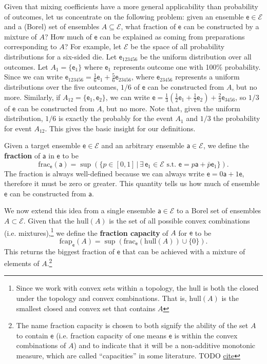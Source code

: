 \documentclass[10pt,twocolumn, nofootinbib]{revtex4-2}
\newcommand\hull{\mathrm{hull}}
\newcommand\fraction{\mathrm{frac}}
\newcommand\frcap{\mathrm{fcap}}
\newcommand{\ens}[1][e] {\mathsf{#1}} %
\newcommand{\Ens}[1][E] {\mathcal{#1}} %
\begin{document}
Given that mixing coefficients have a more general applicability than probability of outcomes, let us concentrate on the following problem: given an ensemble $\ens \in \Ens$ and a (Borel) set of ensembles $A \subseteq \Ens$, what fraction of $\ens$ can be constructed by a mixture of $A$? How much of $\ens$ can be explained as coming from preparations corresponding to $A$? For example, let $\Ens$ be the space of all probability distributions for a six-sided die. Let $\ens_{123456}$ be the uniform distribution over all outcomes. Let $A_1 = \{\ens_1\}$ where $\ens_1$ represents outcome one with 100\% probability. Since we can write $\ens_{123456} = \frac{1}{6} \ens_{1} + \frac{5}{6} \ens_{23456}$, where $\ens_{23456}$ represents a uniform distributions over the five outcomes, $1/6$ of $\ens$ can be constructed from $A$, but no more. Similarly, if $A_{12} = \{\ens_{1},\ens_{2}\}$, we can write $\ens = \frac{1}{3} \left(\frac{1}{2} \ens_1 + \frac{1}{2} \ens_2 \right)  + \frac{2}{3} \ens_{3456}$, so $1/3$ of $\ens$ can be constructed from $A$, but no more. Note that, given the uniform distribution, $1/6$ is exactly the probably for the event $A_1$ and $1/3$ the probability for event $A_{12}$. This gives the basic insight for our definitions.

Given a target ensemble $\ens \in \Ens$ and an arbitrary ensemble $\ens[a] \in \Ens$, we define the \textbf{fraction} of $\ens[a]$ in $\ens$ to be
\begin{equation}
	\fraction_{\ens}(\ens[a]) = \sup(\{ p \in [0,1] \, | \, \exists \, \ens_1 \in \Ens \text{ s.t. }  \ens = p \ens[a] + \bar{p} \ens_1 \}).
\end{equation}
The fraction is always well-defined because we can always write $\ens = 0 \ens[a] + 1 \ens$, therefore it must be zero or greater. This quantity tells us how much of ensemble $\ens$ can be constructed from $\ens[a]$. 

We now extend this idea from a single ensemble $\ens[a] \in \Ens$ to a Borel set of ensembles $A \subset \Ens$. Given that the $\hull(A)$ is the set of all possible convex combinations (i.e. mixtures),\footnote{Since we work with convex sets within a topology, the hull is both the closed under the topology and convex combinations. That is, $\hull(A)$ is the smallest closed and convex set that contains $A$} we define the \textbf{fraction capacity} of $A$ for $\ens$ to be
\begin{equation}
	\frcap_{\ens}(A) = \sup(\fraction_{\ens}(\hull(A))\cup\{0\}).
\end{equation}
This returns the biggest fraction of $\ens$ that can be achieved with a mixture of elements of $A$.\footnote{The name fraction capacity is chosen to both signify the ability of the set $A$ to contain $\ens$ (i.e. fraction capacity of one means $\ens$ is within the convex combinations of $A$) and to indicate that it will be a non-additive monotonic measure, which are called ``capacities'' in some literature. TODO \href{ https://link.springer.com/book/10.1007/978-3-319-03155-2}{cite} }
\end{document}
